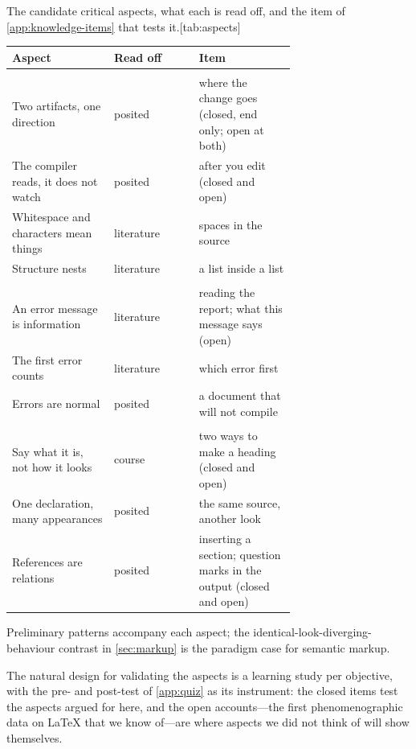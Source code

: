 \begin{table}
  \begin{sidecaption}{The candidate critical aspects, what each is read
    off, and the item of \cref{app:knowledge-items} that tests
    it.}[tab:aspects]
    \small
    \begin{tabular}{@{}>{\raggedright\arraybackslash}p{0.36\linewidth}l>{\raggedright\arraybackslash}p{0.34\linewidth}@{}}
      \toprule
      Aspect & Read off & Item \\
      \midrule
      \multicolumn{3}{@{}l}{\emph{The compile model} (\cref{sec:compilation-aspects})} \\
      Two artifacts, one direction & posited & where the change goes (closed, end only; open at both) \\
      The compiler reads, it does not watch & posited & after you edit (closed and open) \\
      Whitespace and characters mean things & literature & spaces in the source \\
      Structure nests & literature & a list inside a list \\
      \addlinespace
      \multicolumn{3}{@{}l}{\emph{Errors} (\cref{sec:errors-aspects})} \\
      An error message is information & literature & reading the report; what this message says (open) \\
      The first error counts & literature & which error first \\
      Errors are normal & posited & a document that will not compile \\
      \addlinespace
      \multicolumn{3}{@{}l}{\emph{Semantic markup} (\cref{sec:markup-aspects})} \\
      Say what it is, not how it looks & course & two ways to make a heading (closed and open) \\
      One declaration, many appearances & posited & the same source, another look \\
      References are relations & posited & inserting a section; question marks in the output (closed and open) \\
      \bottomrule
    \end{tabular}
  \end{sidecaption}
\end{table}

\rqpatterns*
Preliminary patterns accompany each aspect; the
identical-look-diverging-behaviour contrast in \cref{sec:markup} is the
paradigm case for semantic markup.

The natural design for validating the aspects is a learning study
\autocite[Ch.~7]{NCOL} per objective, with the pre- and post-test of
\cref{app:quiz} as its instrument: the closed items test the aspects
argued for here, and the open accounts---the first phenomenographic data
on LaTeX that we know of---are where aspects we did not think of will
show themselves.
